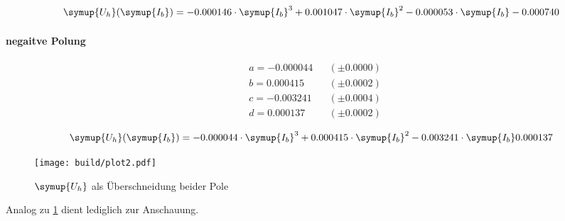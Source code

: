 \begin{equation}
   \symup{U_h}(\symup{I_b})=-0.000146 \cdot \symup{I_b}^3 + 0.001047\cdot\symup{I_b}^2 -0.000053\cdot\symup{I_b} -0.000740
\end{equation}

\paragraph{negaitve Polung}

\begin{align*}
&a = -0.000044 &&(\pm 0.0000) \\
&b = 0.000415 &&(\pm 0.0002) \\
&c = -0.003241 &&(\pm 0.0004) \\
&d = 0.000137 &&(\pm 0.0002) 
\end{align*}

\begin{equation}
   \symup{U_h}(\symup{I_b})=-0.000044 \cdot \symup{I_b}^3 + 0.000415\cdot\symup{I_b}^2 -0.003241\cdot\symup{I_b} 0.000137
\end{equation}

\begin{figure}[!h]
   \centering
   \texttt{[image: build/plot2.pdf]} %
   \caption{$\symup{U_h}$ als Überschneidung beider Pole}
   \label{fig:auswertunghall}
\end{figure}

Analog zu \ref{fig:auswertunghall} dient lediglich zur Anschauung. 

%
